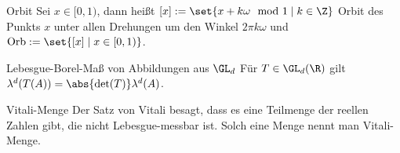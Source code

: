 \begin{karte}{Orbit}
	Sei \( x\in [0,1) \), dann heißt \( [x] := \set{ x + k \omega \mod 1 \;|\; k\in \Z } \) Orbit des 
	Punkts \(x\) unter allen Drehungen um den Winkel \( 2\pi k \omega \) und \( \mathrm{Orb} := \set{ [x] \;|\; x\in [0,1) } \).
\end{karte}

\begin{karte}{Lebesgue-Borel-Maß von Abbildungen aus \(\GL_d\)}
	Für \( T \in \GL_d(\R) \) gilt \( \lambda^d(T(A)) = \abs{\det(T)}\lambda^d(A) \).
\end{karte}

\begin{karte}{Vitali-Menge}
	Der Satz von Vitali besagt, dass es eine Teilmenge der reellen Zahlen gibt, die 
	nicht Lebesgue-messbar ist. Solch eine Menge nennt man Vitali-Menge.
\end{karte}
